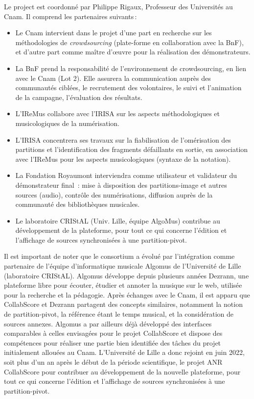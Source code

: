 \documentclass[11pt]{article}
\begin{document}
Le project est coordonné par Philippe Rigaux, Professeur des Universités au Cnam. Il comprend les partenaires suivants\,:

\begin{itemize}
  \item Le Cnam intervient dans le projet d’une part en recherche sur les méthodologies de \textit{crowdsourcing} 
    (plate-forme en collaboration avec la BnF), et d’autre part comme maître d’œuvre pour la réalisation des démonstrateurs.
  \item La BnF prend la responsabilité de l’environnement de crowdsourcing, en lien avec le Cnam (Lot 2). 
    Elle assurera la communication auprès des communautés ciblées, le recrutement des volontaires, 
    le suivi et l’animation de la campagne, l’évaluation des résultats. 
    
   \item L’IReMus collabore avec l’IRISA sur les aspects méthodologiques et musicologiques de la numérisation.
     \item L'IRISA  concentrera ses travaux sur la fiabilisation de l’omérisation des partitions et l’identification 
       des fragments défaillants en sortie, en association avec l’IReMus pour les aspects musicologiques (syntaxe de la notation).
  \item
  La Fondation Royaumont interviendra comme utilisateur et validateur du démonstrateur final : mise à disposition des partitions-image et autres sources (audio), contrôle des numérisations, diffusion auprès de la communauté des bibliothèques musicales. 
 \item Le laboratoire CRIStAL (Univ. Lille, équipe AlgoMus)  contribue
    au développement de la  plateforme, pour tout ce qui concerne l'édition et
  l'affichage de sources synchronisées à une partition-pivot.
\end{itemize}

Il est important de noter que le consortium a évolué par l'intégration comme partenaire
de l’équipe d'informatique musicale Algomus de l’Université de Lille (laboratoire
CRIStAL). Algomus  développe depuis plusieurs années Dezrann, une plateforme libre pour écouter, étudier et annoter
la musique sur le web, utilisée pour la recherche et la pédagogie. Après échanges
avec le Cnam, il est apparu que CollabScore et Dezrann
partagent des concepts similaires, notamment la notion de partition-pivot, la
référence étant le temps musical, et la considération de sources annexes.
Algomus a par ailleurs déjà développé des interfaces comparables à celles
envisagées pour le projet CollabScore et dispose des compétences pour réaliser une
partie bien identifiée des tâches du projet initialement allouées au Cnam. L’Université de Lille 
a donc rejoint en juin 2022, soit plus d'un an après le début de la période scientifique, 
le projet ANR CollabScore pour contribuer
au développement de la nouvelle plateforme, pour tout ce qui concerne l'édition et
l'affichage de sources synchronisées à une partition-pivot.
\end{document}

